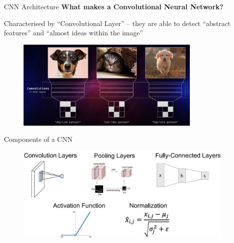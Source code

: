 \begin{frame}{CNN Architecture}
    \textbf{What makes a Convolutional Neural Network?}
    
    Characterised by “Convolutional Layer” – they are able to detect “abstract features” and “almost ideas within the image”

    \newline

    \begin{figure}
    \centering
    \includegraphics[width=0.8\textwidth,height=0.75\textheight,keepaspectratio]{images/what-makes-cnn.png}
    \end{figure}
\end{frame}

\begin{frame}{Components of a CNN}
    \begin{figure}
    \centering
    \includegraphics[width=0.95\textwidth,height=0.95\textheight,keepaspectratio]{images/cnn-components.png}
    \end{figure}
\end{frame}